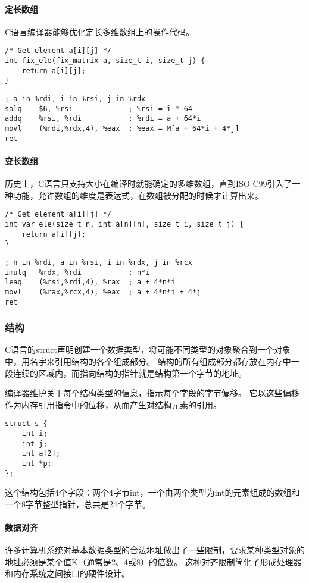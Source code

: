 \paragraph{定长数组}
C语言编译器能够优化定长多维数组上的操作代码。
\begin{lstlisting}[style=CStyle]
/* Get element a[i][j] */
int fix_ele(fix_matrix a, size_t i, size_t j) {
    return a[i][j];
}
\end{lstlisting}
\begin{lstlisting}[style=ASMStyle]
; a in %rdi, i in %rsi, j in %rdx
salq    $6, %rsi             ; %rsi = i * 64
addq    %rsi, %rdi           ; %rdi = a + 64*i
movl    (%rdi,%rdx,4), %eax  ; %eax = M[a + 64*i + 4*j]
ret
\end{lstlisting}
\paragraph{变长数组}
历史上，C语言只支持大小在编译时就能确定的多维数组，直到ISO C99引入了一种功能，允许数组的维度是表达式，在数组被分配的时候才计算出来。
\begin{lstlisting}[style=CStyle]
/* Get element a[i][j] */
int var_ele(size_t n, int a[n][n], size_t i, size_t j) {
    return a[i][j];
}
\end{lstlisting}
\begin{lstlisting}[style=ASMStyle]
; n in %rdi, a in %rsi, i in %rdx, j in %rcx
imulq   %rdx, %rdi           ; n*i
leaq    (%rsi,%rdi,4), %rax  ; a + 4*n*i
movl    (%rax,%rcx,4), %eax  ; a + 4*n*i + 4*j
ret
\end{lstlisting}
\subsubsection{结构}
C语言的struct声明创建一个数据类型，将可能不同类型的对象聚合到一个对象中，用名字来引用结构的各个组成部分。
结构的所有组成部分都存放在内存中一段连续的区域内，而指向结构的指针就是结构第一个字节的地址。

编译器维护关于每个结构类型的信息，指示每个字段的字节偏移。
它以这些偏移作为内存引用指令中的位移，从而产生对结构元素的引用。
\begin{lstlisting}[style=CStyle]
struct s {
    int i;
    int j;
    int a[2];
    int *p;
};
\end{lstlisting}

这个结构包括4个字段：两个4字节int，一个由两个类型为int的元素组成的数组和一个8字节整型指针，总共是24个字节。

\paragraph{数据对齐}
许多计算机系统对基本数据类型的合法地址做出了一些限制，要求某种类型对象的地址必须是某个值K（通常是2、4或8）的倍数。
这种对齐限制简化了形成处理器和内存系统之间接口的硬件设计。

